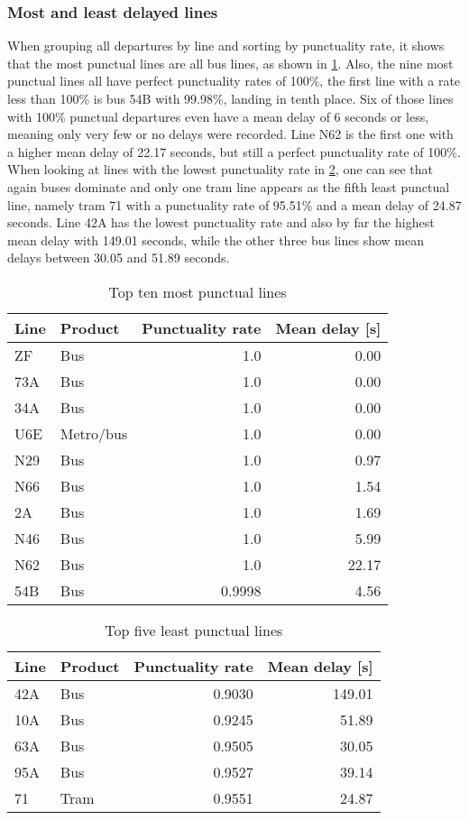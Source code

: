 \subsubsection{Most and least delayed lines}

When grouping all departures by line and sorting by punctuality rate, it shows that the most punctual lines are all bus lines, as shown in \cref{table:overall-top10-most}. Also, the nine most punctual lines all have perfect punctuality rates of 100\%, the first line with a rate less than 100\% is bus 54B with 99.98\%, landing in tenth place. Six of those lines with 100\% punctual departures even have a mean delay of 6 seconds or less, meaning only very few or no delays were recorded. Line N62 is the first one with a higher mean delay of 22.17 seconds, but still a perfect punctuality rate of 100\%. When looking at lines with the lowest punctuality rate in \cref{table:overall-top5-least}, one can see that again buses dominate and only one tram line appears as the fifth least punctual line, namely tram 71 with a punctuality rate of 95.51\% and a mean delay of 24.87 seconds. Line 42A has the lowest punctuality rate and also by far the highest mean delay with 149.01 seconds, while the other three bus lines show mean delays between 30.05 and 51.89 seconds.

\begin{table}
	\centering
	\begin{tabular}{llrr}
		\toprule
		Line & Product & Punctuality rate & Mean delay [s] \\
		\midrule
		ZF & Bus &  1.0 & 0.00 \\
		73A & Bus &  1.0 & 0.00 \\
		34A & Bus &  1.0 & 0.00 \\
		U6E & Metro/bus &  1.0 & 0.00 \\
		N29 & Bus &  1.0 & 0.97 \\
		N66 & Bus &  1.0 & 1.54 \\
		2A & Bus & 1.0 & 1.69 \\
		N46 & Bus &  1.0 & 5.99 \\
		N62 & Bus & 1.0 & 22.17 \\
		54B & Bus &  0.9998 & 4.56 \\
		\bottomrule
	\end{tabular}
	\caption{Top ten most punctual lines}
	\label{table:overall-top10-most}
\end{table}

\begin{table}
	\centering
	\begin{tabular}{llrr}
		\toprule
		Line & Product & Punctuality rate & Mean delay [s] \\
		\midrule
		42A & Bus & 0.9030 & 149.01 \\
		10A & Bus &  0.9245 & 51.89 \\
		63A & Bus &  0.9505 & 30.05 \\
		95A & Bus & 0.9527 & 39.14 \\
		71 & Tram &  0.9551 & 24.87 \\
		\bottomrule
	\end{tabular}
	\caption{Top five least punctual lines}
	\label{table:overall-top5-least}
\end{table}

